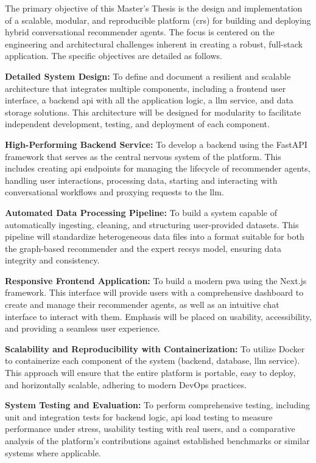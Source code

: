 The primary objective of this Master's Thesis is the design and implementation of a scalable, modular, and reproducible platform (\acl{crs}) for building and deploying hybrid conversational recommender agents. The focus is centered on the engineering and architectural challenges inherent in creating a robust, full-stack application. The specific objectives are detailed as follows.

\begin{objetive}
    \item \textbf{Detailed System Design:} To define and document a resilient and scalable architecture that integrates multiple components, including a frontend user interface, a backend \acs{api} with all the application logic, a \ac{llm} service, and data storage solutions. This architecture will be designed for modularity to facilitate independent development, testing, and deployment of each component.

    \item \textbf{High-Performing Backend Service:} To develop a backend using the FastAPI framework that serves as the central nervous system of the platform. This includes creating \acs{api} endpoints for managing the lifecycle of recommender agents, handling user interactions, processing data, starting and interacting with conversational workflows and proxying requests to the \ac{llm}.

    \item \textbf{Automated Data Processing Pipeline:} To build a system capable of automatically ingesting, cleaning, and structuring user-provided datasets. This pipeline will standardize heterogeneous data files into a format suitable for both the graph-based recommender and the expert \acs{recsys} model, ensuring data integrity and consistency.

    \item \textbf{Responsive Frontend Application:} To build a modern \ac{pwa} using the Next.js framework. This interface will provide users with a comprehensive dashboard to create and manage their recommender agents, as well as an intuitive chat interface to interact with them. Emphasis will be placed on usability, accessibility, and providing a seamless user experience.

    \item \textbf{Scalability and Reproducibility with Containerization:} To utilize Docker to containerize each component of the system (backend, database, \ac{llm} service). This approach will ensure that the entire platform is portable, easy to deploy, and horizontally scalable, adhering to modern DevOps practices.

    \item \textbf{System Testing and Evaluation:} To perform comprehensive testing, including unit and integration tests for backend logic, \acs{api} load testing to measure performance under stress, usability testing with real users, and a comparative analysis of the platform's contributions against established benchmarks or similar systems where applicable.
\end{objetive}


